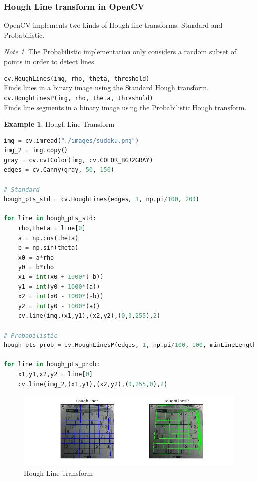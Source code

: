 \documentclass{article}
\theoremstyle{definition}
\newtheorem{ex}{Example}[subsection]
\theoremstyle{remark}
\newtheorem*{nb}{Note}
\newcommand{\func}[2]{\noindent\lstinline{#1}\\#2}
\begin{document}
\subsubsection{Hough Line transform in OpenCV}

OpenCV implements two kinds of Hough line transforms: Standard and Probabilistic.

\begin{nb}
The Probabilistic implementation only considers a random subset of points in order to detect lines.
\end{nb}

\func{cv.HoughLines(img, rho, theta, threshold)}{Finds lines in a binary image using the Standard Hough transform.}\\

\func{cv.HoughLinesP(img, rho, theta, threshold)}{Finds line segments in a binary image using the Probabilistic Hough transform.}

\begin{ex} Hough Line Transform
\begin{lstlisting}[language=Python]
img = cv.imread("./images/sudoku.png")
img_2 = img.copy()
gray = cv.cvtColor(img, cv.COLOR_BGR2GRAY)
edges = cv.Canny(gray, 50, 150)

# Standard
hough_pts_std = cv.HoughLines(edges, 1, np.pi/100, 200)

for line in hough_pts_std:
    rho,theta = line[0]
    a = np.cos(theta)
    b = np.sin(theta)
    x0 = a*rho
    y0 = b*rho
    x1 = int(x0 + 1000*(-b))
    y1 = int(y0 + 1000*(a))
    x2 = int(x0 - 1000*(-b))
    y2 = int(y0 - 1000*(a))
    cv.line(img,(x1,y1),(x2,y2),(0,0,255),2)

# Probabilistic
hough_pts_prob = cv.HoughLinesP(edges, 1, np.pi/100, 100, minLineLength=100, maxLineGap=10)

for line in hough_pts_prob:
    x1,y1,x2,y2 = line[0]
    cv.line(img_2,(x1,y1),(x2,y2),(0,255,0),2)
\end{lstlisting}
\begin{figure}[H]
    \centering
    \includegraphics[width=\textwidth]{ocv_hlt}
    \caption{Hough Line Transform}
    \label{fig:ocv_hlt}
\end{figure}
\end{ex}
\end{document}
